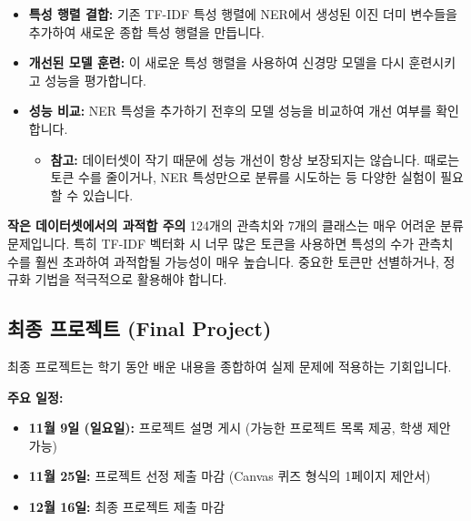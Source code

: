 \documentclass[11pt,a4paper]{article}
\begin{document}
\begin{enumerate}
\begin{itemize}
                \begin{itemize}
                    \item 0: 해당 개체가 문서에 없음
                    \item 1: 해당 개체가 문서에 한 번 이상 존재함
                \end{itemize}
            \item \textbf{특성 행렬 결합:} 기존 TF-IDF 특성 행렬에 NER에서 생성된 이진 더미 변수들을 추가하여 새로운 종합 특성 행렬을 만듭니다.
            \item \textbf{개선된 모델 훈련:} 이 새로운 특성 행렬을 사용하여 신경망 모델을 다시 훈련시키고 성능을 평가합니다.
            \item \textbf{성능 비교:} NER 특성을 추가하기 전후의 모델 성능을 비교하여 개선 여부를 확인합니다.
                \begin{itemize}
                    \item \textbf{참고:} 데이터셋이 작기 때문에 성능 개선이 항상 보장되지는 않습니다. 때로는 토큰 수를 줄이거나, NER 특성만으로 분류를 시도하는 등 다양한 실험이 필요할 수 있습니다.
                \end{itemize}
        \end{itemize}
\end{enumerate}

\begin{warningbox}
\textbf{작은 데이터셋에서의 과적합 주의}
124개의 관측치와 7개의 클래스는 매우 어려운 분류 문제입니다. 특히 TF-IDF 벡터화 시 너무 많은 토큰을 사용하면 특성의 수가 관측치 수를 훨씬 초과하여 과적합될 가능성이 매우 높습니다. 중요한 토큰만 선별하거나, 정규화 기법을 적극적으로 활용해야 합니다.
\end{warningbox}

\newpage
\subsection{최종 프로젝트 (Final Project)}
최종 프로젝트는 학기 동안 배운 내용을 종합하여 실제 문제에 적용하는 기회입니다.

\textbf{주요 일정:}
\begin{itemize}
    \item \textbf{11월 9일 (일요일):} 프로젝트 설명 게시 (가능한 프로젝트 목록 제공, 학생 제안 가능)
    \item \textbf{11월 25일:} 프로젝트 선정 제출 마감 (Canvas 퀴즈 형식의 1페이지 제안서)
    \item \textbf{12월 16일:} 최종 프로젝트 제출 마감
\end{itemize}
\end{document}
